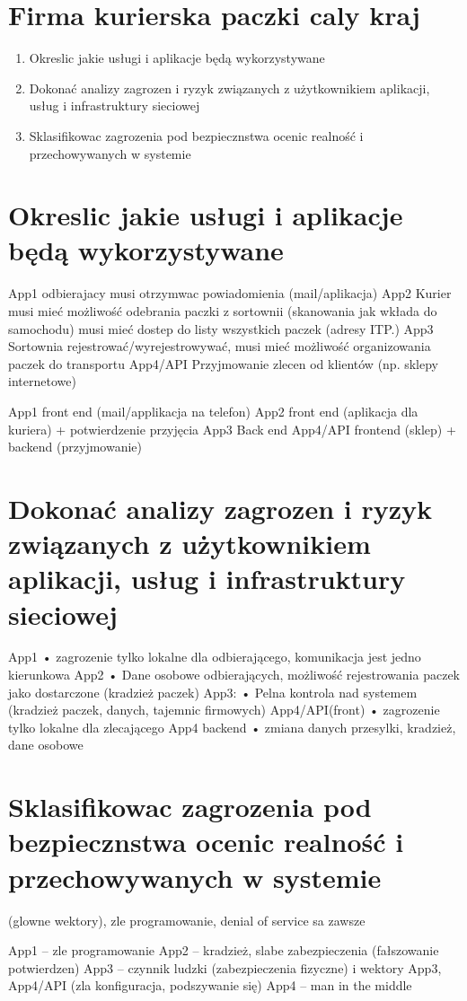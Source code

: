 \documentclass[11pt]{article}
\author{Patryk Kaniewski}
\date{\today}
\title{}
\begin{document}
\tableofcontents \clearpage\section{Firma kurierska paczki caly kraj}
\label{sec:orgfa62d01}
\begin{enumerate}
\item Okreslic jakie usługi i aplikacje będą wykorzystywane
\item Dokonać analizy zagrozen i ryzyk związanych z użytkownikiem aplikacji, usług i infrastruktury sieciowej
\item Sklasifikowac zagrozenia pod bezpiecznstwa ocenic realność i przechowywanych w systemie
\end{enumerate}

\section{Okreslic jakie usługi i aplikacje będą wykorzystywane}
\label{sec:orgba3a39a}
App1 odbierajacy musi otrzymwac powiadomienia (mail/aplikacja)
App2 Kurier musi mieć możliwość odebrania paczki z sortownii (skanowania jak wkłada do samochodu) musi mieć dostep do listy wszystkich paczek (adresy ITP.) 
App3 Sortownia rejestrować/wyrejestrowywać, musi mieć możliwość organizowania paczek do transportu
App4/API Przyjmowanie zlecen od klientów (np. sklepy internetowe)



App1 front end (mail/applikacja na telefon)
App2 front end (aplikacja dla kuriera) + potwierdzenie przyjęcia
App3 Back end
App4/API frontend (sklep) + backend (przyjmowanie)


\section{Dokonać analizy zagrozen i ryzyk związanych z użytkownikiem aplikacji, usług i infrastruktury sieciowej}
\label{sec:org7f43e7b}
App1 
    • zagrozenie tylko lokalne dla odbierającego, komunikacja jest jedno kierunkowa
App2
    • Dane osobowe odbierających, możliwość rejestrowania paczek jako dostarczone (kradzież paczek)
App3:
    • Pelna kontrola nad systemem (kradzież paczek, danych, tajemnic firmowych)
App4/API(front)
    • zagrozenie tylko lokalne dla zlecającego
App4 backend
    • zmiana danych przesylki, kradzież, dane osobowe

\section{Sklasifikowac zagrozenia pod bezpiecznstwa ocenic realność i przechowywanych w systemie}
\label{sec:org71ed77f}
(glowne wektory), zle programowanie, denial of service sa zawsze

App1 – zle programowanie
App2 – kradzież, slabe zabezpieczenia (fałszowanie potwierdzen)
App3 – czynnik ludzki (zabezpieczenia fizyczne) i wektory App3, App4/API (zla konfiguracja, podszywanie się)
App4 – man in the middle
\end{document}

